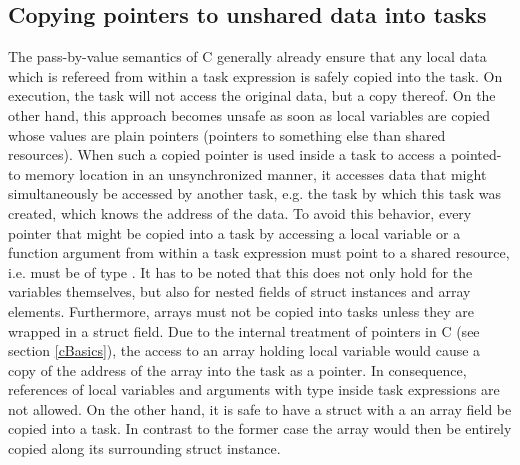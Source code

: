 \subsection{Copying pointers to unshared data into tasks}
The pass-by-value semantics of C generally already ensure that any local data which is refereed from within a task expression is safely copied into the task. On execution, the task will not access the original data, but a copy thereof. On the other hand, this approach becomes unsafe as soon as local variables are copied whose values are plain pointers (pointers to something else than shared resources). When such a copied pointer is used inside a task to access a pointed-to memory location in an unsynchronized manner, it accesses data that might simultaneously be accessed by another task, e.g. the task by which this task was created, which knows the address of the data. To avoid this behavior, every pointer that might be copied into a task by accessing a local variable or a function argument from within a task expression must point to a shared resource, i.e. must be of type . It has to be noted that this does not only hold for the variables themselves, but also for nested fields of struct instances and array elements. Furthermore, arrays must not be copied into tasks unless they are wrapped in a struct field. Due to the internal treatment of pointers in C (see section \ref{cBasics}), the access to an array holding local variable would cause a copy of the address of the array into the task as a pointer. In consequence, references of local variables and arguments with type  inside task expressions are not allowed. On the other hand, it is safe to have a struct with a an array field be copied into a task. In contrast to the former case the array would then be entirely copied along its surrounding struct instance.

